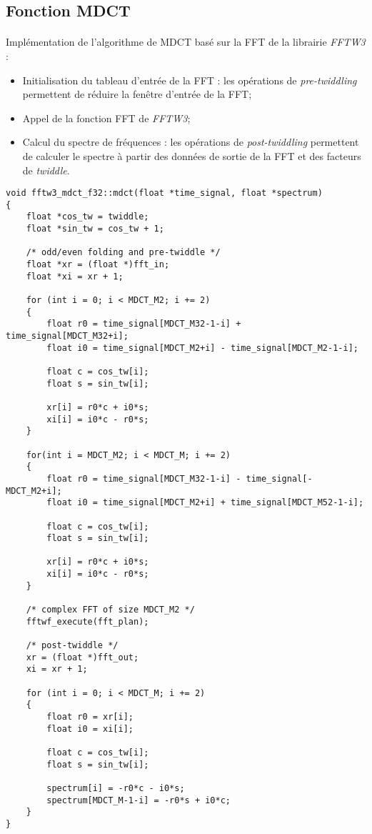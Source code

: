 \documentclass{article}
\begin{document}
\subsection{Fonction MDCT}\label{app:mdct_fftw3_f32_func}
\paragraph{}
Implémentation de l'algorithme de MDCT basé sur la FFT de la librairie \emph{FFTW3} :
\begin{itemize}
    \item Initialisation du tableau d'entrée de la FFT : les opérations de \emph{pre-twiddling} permettent de réduire la fenêtre d'entrée de la FFT;
    \item Appel de la fonction FFT de \emph{FFTW3};
    \item Calcul du spectre de fréquences : les opérations de \emph{post-twiddling} permettent de calculer le spectre à partir des données de sortie de la FFT et des facteurs de \emph{twiddle}.
\end{itemize}
\lstset{language=C++}
\begin{lstlisting}
void fftw3_mdct_f32::mdct(float *time_signal, float *spectrum)
{
    float *cos_tw = twiddle;
    float *sin_tw = cos_tw + 1;

    /* odd/even folding and pre-twiddle */
    float *xr = (float *)fft_in;
    float *xi = xr + 1;

    for (int i = 0; i < MDCT_M2; i += 2)
    {
        float r0 = time_signal[MDCT_M32-1-i] + time_signal[MDCT_M32+i];
        float i0 = time_signal[MDCT_M2+i] - time_signal[MDCT_M2-1-i];

        float c = cos_tw[i];
        float s = sin_tw[i];

        xr[i] = r0*c + i0*s;
        xi[i] = i0*c - r0*s;
    }

    for(int i = MDCT_M2; i < MDCT_M; i += 2)
    {
        float r0 = time_signal[MDCT_M32-1-i] - time_signal[-MDCT_M2+i];
        float i0 = time_signal[MDCT_M2+i] + time_signal[MDCT_M52-1-i];

        float c = cos_tw[i];
        float s = sin_tw[i];

        xr[i] = r0*c + i0*s;
        xi[i] = i0*c - r0*s;
    }

    /* complex FFT of size MDCT_M2 */
    fftwf_execute(fft_plan);

    /* post-twiddle */
    xr = (float *)fft_out;
    xi = xr + 1;

    for (int i = 0; i < MDCT_M; i += 2)
    {
        float r0 = xr[i];
        float i0 = xi[i];

        float c = cos_tw[i];
        float s = sin_tw[i];

        spectrum[i] = -r0*c - i0*s;
        spectrum[MDCT_M-1-i] = -r0*s + i0*c;
    }
}
\end{lstlisting}
\end{document}
